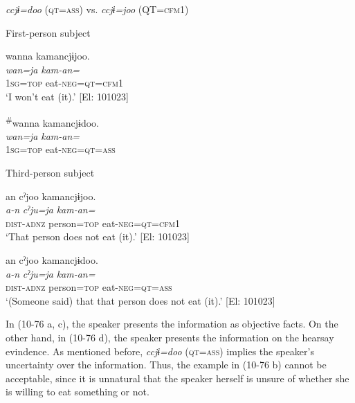 \ea\label{ex:10.76}   \textit{ccjɨ=doo} (\textsc{qt}=\textsc{ass}) vs. \textit{ccjɨ=joo} (QT=\textsc{cfm}1)\\
  \begin{xlist}
  \exi{} First-person subject

  \ex  %
      \glll    wanna  kamancjɨjoo.  \\
      \textit{wan=ja}  \textit{kam-an=}  \\
      1\textsc{sg}=\textsc{top}  eat-\textsc{neg}=\textsc{qt}=\textsc{cfm}1  \\
      \glt       ‘I won’t eat (it).’ [El: 101023]

  \ex  %
      \glll    \textsuperscript{\#}wanna  kamancjɨdoo.\\
      \textit{wan=ja}  \textit{kam-an=}\\
      1\textsc{sg}=\textsc{top}  eat-\textsc{neg}=\textsc{qt}=\textsc{ass}\\
      \glt [El: 101023]

  \exi{} Third-person subject

  \ex  %
      \glll     an  cˀjoo  kamancjɨjoo.\\
      \textit{a-n}  \textit{cˀju=ja}  \textit{kam-an=}\\
      \textsc{dist}-\textsc{adnz}  person=\textsc{top}  eat-\textsc{neg}=\textsc{qt}=\textsc{cfm}1\\
      \glt        ‘That person does not eat (it).’ [El: 101023]

  \ex  %
      \glll     an  cˀjoo  kamancjɨdoo.\\
      \textit{a-n}  \textit{cˀju=ja}  \textit{kam-an=}\\
      \textsc{dist}-\textsc{adnz}  person=\textsc{top}  eat-\textsc{neg}=\textsc{qt}=\textsc{ass}\\
      \glt        ‘(Someone said) that that person does not eat (it).’ [El: 101023]
    \end{xlist}
\z

In (10-76 a, c), the speaker presents the information as objective facts. On the other hand, in (10-76 d), the speaker presents the information on the hearsay evindence. As mentioned before, \textit{ccjɨ=doo} (\textsc{qt}=\textsc{ass}) implies the speaker’s uncertainty over the information. Thus, the example in (10-76 b) cannot be acceptable, since it is unnatural that the speaker herself is unsure of whether she is willing to eat something or not.

